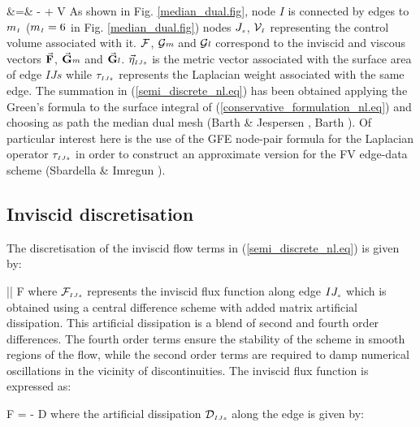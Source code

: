 %
\beq
   &=& -\!
  \sum{} 
  + {\cal V}
  \label{semi_discrete_nl.eq}
\eeq
%
 As shown in Fig. \ref{median_dual.fig}, node $I$ is connected by edges to
 $m_{\mbox{\tiny $I$}}$ ($m_{\mbox{\tiny $I$}} = 6$ in Fig. \ref{median_dual.fig})
 nodes $J_{\mbox{\tiny $s$}}$, ${\cal V}_{\mbox{\tiny $I$}}$ representing the control volume
 associated with it.
 ${\cal F}$, ${\cal G}\scriptstyle{m}$ and ${\cal G}\scriptstyle{l}$
 correspond to the inviscid and viscous vectors $\vec{\bf F}$,
 $\vec{\bf G}\scriptstyle{m}$ and $\vec{\bf G}\scriptstyle{l}$.
 $\vec{\eta}_{\mbox{\tiny $IJs$}}$ is the metric vector associated with the
 surface area of edge $IJs$ while $\tau_{\mbox{\tiny $IJs$}}$ represents the Laplacian
 weight associated with the same edge.
 The summation in (\ref{semi_discrete_nl.eq}) has been obtained applying
 the Green's formula to the surface integral of (\ref{conservative_formulation_nl.eq})
 and choosing as path the median dual mesh (Barth \& Jespersen ,
 Barth ).
 Of particular interest here is the use of the GFE node-pair formula
 for the Laplacian operator $\tau_{\mbox{\tiny $IJs$}}$ in order to construct
 an approximate version for the FV edge-data scheme
 (Sbardella \& Imregun ).
%
%
%
%
%
\subsection{Inviscid discretisation}
\label{inviscid_disretisation.subsec}
%
 The discretisation of the inviscid flow terms in
 (\ref{semi_discrete_nl.eq}) is given by:

%
\beq
  \sum{} \left|\vec{\eta}\right|
  {\cal F}
 \label{inviscid_contribution_nl.eq}
\eeq
%
 where ${\cal F}_{\mbox{\tiny $IJs$}}$ represents the inviscid flux function along edge
 $IJ_{\mbox{\tiny $s$}}$
 which is obtained using a central difference scheme with added
 matrix artificial dissipation. This artificial dissipation
 is a blend of second and fourth order differences. The fourth order
 terms ensure the stability of the scheme in smooth regions of the flow,
 while the second order terms are required to damp numerical oscillations
 in the vicinity of discontinuities.
 The inviscid flux function is expressed as:

%
\beq
  {\cal F} = 
  \cdot{}
  - {\cal D}
  \label{inviscid_flux_function_nl.eq}
\eeq
%
 where the artificial dissipation ${\cal D}_{\mbox{\tiny $IJs$}}$ along the edge is
 given by:

